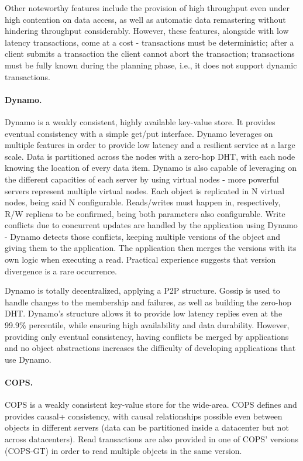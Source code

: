Other noteworthy features include the provision of high throughput even under high contention on data access, as well as automatic data remastering without hindering throughput considerably.
However, these features, alongside with low latency transactions, come at a cost - transactions must be deterministic; after a client submits a transaction the client cannot abort the transaction; transactions must be fully known during the planning phase, i.e., it does not support dynamic transactions.

\paragraph{Dynamo.} Dynamo \cite{dynamo} is a weakly consistent, highly available key-value store.
It provides eventual consistency with a simple get/put interface.
Dynamo leverages on multiple features in order to provide low latency and a resilient service at a large scale.
Data is partitioned across the nodes with a zero-hop DHT, with each node knowing the location of every data item.
Dynamo is also capable of leveraging on the different capacities of each server by using virtual nodes - more powerful servers represent multiple virtual nodes.
Each object is replicated in N virtual nodes, being said N configurable. Reads/writes must happen in, respectively, R/W replicas to be confirmed, being both parameters also configurable.
Write conflicts due to concurrent updates are handled by the application using Dynamo - Dynamo detects those conflicts, keeping multiple versions of the object and giving them to the application.
The application then merges the versions with its own logic when executing a read.
Practical experience suggests that version divergence is a rare occurrence.

Dynamo is totally decentralized, applying a P2P structure.
Gossip is used to handle changes to the membership and failures, as well as building the zero-hop DHT.
Dynamo's structure allows it to provide low latency replies even at the 99.9\% percentile, while ensuring high availability and data durability.
However, providing only eventual consistency, having conflicts be merged by applications and no object abstractions increases the difficulty of developing applications that use Dynamo.

\paragraph{COPS.} COPS \cite{cops} is a weakly consistent key-value store for the wide-area.
COPS defines and provides causal+ consistency, with causal relationships possible even between objects in different servers (data can be partitioned inside a datacenter but not across datacenters).
Read transactions are also provided in one of COPS' versions (COPS-GT) in order to read multiple objects in the same version.

